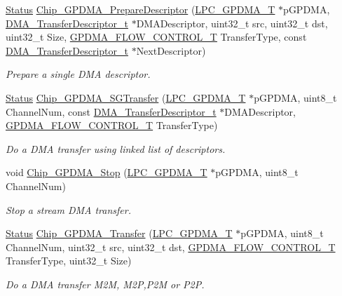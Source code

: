 \begin{DoxyCompactItemize}
\hyperlink{group__LPC__Types__Public__Types_ga67a0db04d321a74b7e7fcfd3f1a3f70b}{Status} \hyperlink{group__GPDMA__17XX__40XX_ga8605c52de33b7a8977eadaa480f5807c}{Chip\+\_\+\+G\+P\+D\+M\+A\+\_\+\+Prepare\+Descriptor} (\hyperlink{structLPC__GPDMA__T}{L\+P\+C\+\_\+\+G\+P\+D\+M\+A\+\_\+T} $\ast$p\+G\+P\+D\+MA, \hyperlink{group__GPDMA__17XX__40XX_ga23dbdf610f0d1f61ae30a69944bbee55}{D\+M\+A\+\_\+\+Transfer\+Descriptor\+\_\+t} $\ast$D\+M\+A\+Descriptor, uint32\+\_\+t src, uint32\+\_\+t dst, uint32\+\_\+t Size, \hyperlink{group__GPDMA__17XX__40XX_ga2cb59b641cd840f22780c44be1208133}{G\+P\+D\+M\+A\+\_\+\+F\+L\+O\+W\+\_\+\+C\+O\+N\+T\+R\+O\+L\+\_\+T} Transfer\+Type, const \hyperlink{group__GPDMA__17XX__40XX_ga23dbdf610f0d1f61ae30a69944bbee55}{D\+M\+A\+\_\+\+Transfer\+Descriptor\+\_\+t} $\ast$Next\+Descriptor)
\begin{DoxyCompactList}\small\item\em Prepare a single D\+MA descriptor. \end{DoxyCompactList}\item 
\hyperlink{group__LPC__Types__Public__Types_ga67a0db04d321a74b7e7fcfd3f1a3f70b}{Status} \hyperlink{group__GPDMA__17XX__40XX_ga6a2f7c7238f4288cb73baec79c3e38a7}{Chip\+\_\+\+G\+P\+D\+M\+A\+\_\+\+S\+G\+Transfer} (\hyperlink{structLPC__GPDMA__T}{L\+P\+C\+\_\+\+G\+P\+D\+M\+A\+\_\+T} $\ast$p\+G\+P\+D\+MA, uint8\+\_\+t Channel\+Num, const \hyperlink{group__GPDMA__17XX__40XX_ga23dbdf610f0d1f61ae30a69944bbee55}{D\+M\+A\+\_\+\+Transfer\+Descriptor\+\_\+t} $\ast$D\+M\+A\+Descriptor, \hyperlink{group__GPDMA__17XX__40XX_ga2cb59b641cd840f22780c44be1208133}{G\+P\+D\+M\+A\+\_\+\+F\+L\+O\+W\+\_\+\+C\+O\+N\+T\+R\+O\+L\+\_\+T} Transfer\+Type)
\begin{DoxyCompactList}\small\item\em Do a D\+MA transfer using linked list of descriptors. \end{DoxyCompactList}\item 
void \hyperlink{group__GPDMA__17XX__40XX_gafa887387f85205ecacc3220700b49d0d}{Chip\+\_\+\+G\+P\+D\+M\+A\+\_\+\+Stop} (\hyperlink{structLPC__GPDMA__T}{L\+P\+C\+\_\+\+G\+P\+D\+M\+A\+\_\+T} $\ast$p\+G\+P\+D\+MA, uint8\+\_\+t Channel\+Num)
\begin{DoxyCompactList}\small\item\em Stop a stream D\+MA transfer. \end{DoxyCompactList}\item 
\hyperlink{group__LPC__Types__Public__Types_ga67a0db04d321a74b7e7fcfd3f1a3f70b}{Status} \hyperlink{group__GPDMA__17XX__40XX_ga53a4dbf10ce59c17b0dd2284fa635580}{Chip\+\_\+\+G\+P\+D\+M\+A\+\_\+\+Transfer} (\hyperlink{structLPC__GPDMA__T}{L\+P\+C\+\_\+\+G\+P\+D\+M\+A\+\_\+T} $\ast$p\+G\+P\+D\+MA, uint8\+\_\+t Channel\+Num, uint32\+\_\+t src, uint32\+\_\+t dst, \hyperlink{group__GPDMA__17XX__40XX_ga2cb59b641cd840f22780c44be1208133}{G\+P\+D\+M\+A\+\_\+\+F\+L\+O\+W\+\_\+\+C\+O\+N\+T\+R\+O\+L\+\_\+T} Transfer\+Type, uint32\+\_\+t Size)
\begin{DoxyCompactList}\small\item\em Do a D\+MA transfer M2M, M2P,P2M or P2P. \end{DoxyCompactList}\end{DoxyCompactItemize}


